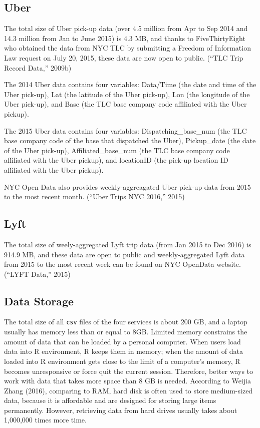 \documentclass[12pt,twoside]{reedthesis}
\theoremstyle{definition}
\theoremstyle{definition}
\theoremstyle{definition}
\theoremstyle{remark}
\begin{document}
\subsection{Uber}\label{uber-1}

The total size of Uber pick-up data (over 4.5 million from Apr to Sep
2014 and 14.3 million from Jan to June 2015) is 4.3 MB, and thanks to
FiveThirtyEight who obtained the data from NYC TLC by submitting a
Freedom of Information Law request on July 20, 2015, these data are now
open to public. (``TLC Trip Record Data,'' 2009b)

The 2014 Uber data contains four variables: Data/Time (the date and time
of the Uber pick-up), Lat (the latitude of the Uber pick-up), Lon (the
longitude of the Uber pick-up), and Base (the TLC base company code
affiliated with the Uber pickup).

The 2015 Uber data contains four variables: Dispatching\_base\_num (the
TLC base company code of the base that dispatched the Uber),
Pickup\_date (the date of the Uber pick-up), Affiliated\_base\_num (the
TLC base company code affiliated with the Uber pickup), and locationID
(the pick-up location ID affiliated with the Uber pickup).

NYC Open Data also provides weekly-aggreagated Uber pick-up data from
2015 to the most recent month. (``Uber Trips NYC 2016,'' 2015)

\subsection{Lyft}\label{lyft-1}

The total size of weely-aggregated Lyft trip data (from Jan 2015 to Dec
2016) is 914.9 MB, and these data are open to public and
weekly-aggregated Lyft data from 2015 to the most recent week can be
found on NYC OpenData website. (``LYFT Data,'' 2015)

\subsection{Data Storage}\label{data-storage}

The total size of all \texttt{csv} files of the four services is about
200 GB, and a laptop usually has memory less than or equal to 8GB.
Limited memory constrains the amount of data that can be loaded by a
personal computer. When users load data into R environment, R keeps them
in memory; when the amount of data loaded into R environment gets close
to the limit of a computer's memory, R becomes unresponsive or force
quit the current session. Therefore, better ways to work with data that
takes more space than 8 GB is needed. According to Weijia Zhang (2016),
comparing to RAM, hard disk is often used to store medium-sized data,
because it is affordable and are designed for storing large items
permanently. However, retrieving data from hard drives usually takes
about 1,000,000 times more time.
\end{document}
